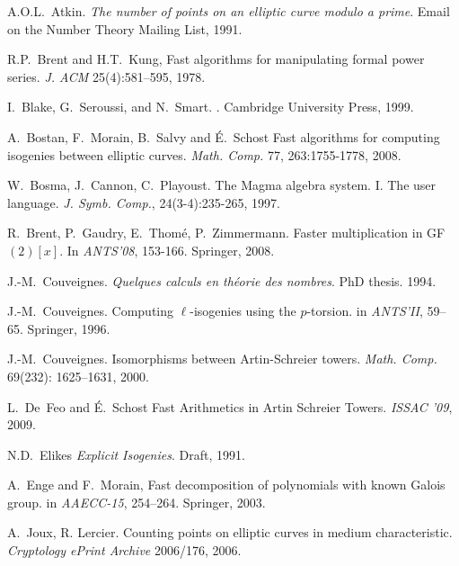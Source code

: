 
\scriptsize

\begin{thebibliography}{10}

  A.O.L.~Atkin.
  \newblock \emph{The number of points on an elliptic curve modulo a prime}.
  \newblock Email on the Number Theory Mailing List, 1991.

R.P.~Brent and H.T.~Kung, Fast algorithms for
  manipulating formal power series.  \emph{J. ACM} 25(4):581--595, 1978.

  I.~Blake, G.~Seroussi, and N.~Smart.
  .
  \newblock Cambridge University Press, 1999.

  A.~Bostan, F.~Morain, B.~Salvy and É.~Schost
  \newblock Fast algorithms for computing isogenies between elliptic curves.
  \newblock \emph{Math. Comp.} 77, 263:1755-1778, 2008.

  W.~Bosma, J.~Cannon, C.~Playoust.
  \newblock The Magma algebra system. I. The user language.
  \newblock \emph{J. Symb. Comp.}, 24(3-4):235-265, 1997.
  
  R.~Brent, P.~Gaudry, E.~Thom{\'e}, P.~Zimmermann.
  \newblock Faster multi\-plication in GF$(2)[x]$.
  \newblock In {\em ANTS'08}, 153-166. Springer, 2008.

  J.-M.~Couveignes.
  \newblock \emph{Quelques calculs en théorie des nombres}.
  \newblock PhD thesis. 1994.

  J.-M.~Couveignes. 
  \newblock Computing {$\ell$}-isogenies using the {$p$}-torsion.
  \newblock in {\em ANTS'II}, 59--65. Springer, 1996.

  J.-M.~Couveignes. 
  \newblock Isomorphisms between {A}rtin-{S}chreier towers. 
  \newblock \emph{Math. Comp.} 69(232): 1625--1631, 2000.
  
  L.~De~Feo and É.~Schost
  \newblock Fast Arithmetics in Artin Schreier Towers.
  \newblock \emph{ISSAC '09}, 2009.

  N.D.~Elikes
  \newblock \emph{Explicit Isogenies}.
  Draft, 1991.

  A.~Enge and F.~Morain,
  \newblock Fast decomposition of polynomials with known Galois group.
  \newblock in {\em AAECC-15}, 254--264. Springer, 2003.

A.~Joux, R. Lercier.
  \newblock Counting points on elliptic curves in medium characteristic.
  \newblock \emph{Cryptology ePrint Archive} 2006/176, 2006.


\end{thebibliography}
